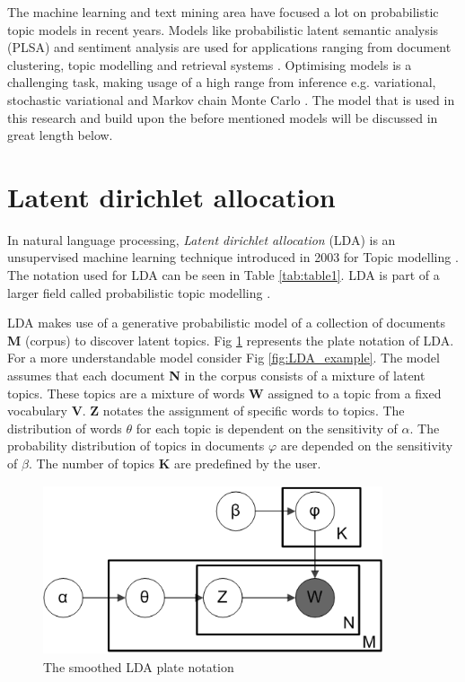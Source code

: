 The machine learning and text mining area have focused a lot on probabilistic topic models in recent years. Models like probabilistic latent semantic analysis (PLSA) and sentiment analysis are used for applications ranging from document clustering, topic modelling and retrieval systems \cite{Lu2011InvestigatingLDA}. Optimising models is a challenging task, making usage of a high range from inference e.g. variational, stochastic variational and Markov chain Monte Carlo \cite{Hoffman2016MarkovModels}. The model that is used in this research and build upon the before mentioned models will be discussed in great length below.


\section{Latent dirichlet allocation}\label{lda:lda}
In natural language processing, \textit{Latent dirichlet allocation} (LDA) is an unsupervised machine learning technique introduced in 2003 for Topic modelling \cite{Blei2003LatentAllocation}. The notation used for LDA can be seen in Table \ref{tab:table1}. LDA is part of a larger field called probabilistic topic modelling \cite{Blei2010}.

LDA makes use of a generative probabilistic model of a collection of documents \textbf{M} (corpus) to discover latent topics. Fig \ref{fig:LDA} represents the plate notation of LDA. For a more understandable model consider Fig \ref{fig:LDA_example}. The model assumes that each document \textbf{N} in the corpus consists of a mixture of latent topics. These topics are a mixture of words \textbf{W} assigned to a topic from a fixed vocabulary \textbf{V}. \textbf{Z} notates the assignment of specific words to topics. The distribution of words $\theta$ for each topic is dependent on the sensitivity of $\alpha$. The probability distribution of topics in documents $\varphi$ are depended on the sensitivity of $\beta$. The number of topics \textbf{K} are predefined by the user. 

\begin{figure}
    \centering
    \includegraphics[width=10cm, height=5cm]{methodology/Smoothed_LDA.png}
    \caption{The smoothed LDA plate notation}
    \label{fig:LDA}
\end{figure}

